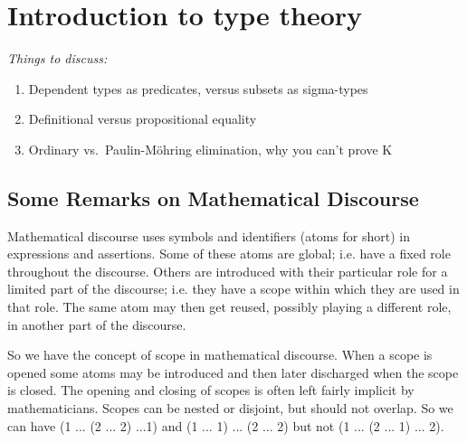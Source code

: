 \chapter{Introduction to type theory}
\label{cha:introduction}

{\it
Things to discuss:
\begin{enumerate}
\item Dependent types as predicates, versus subsets as sigma-types
\item Definitional versus propositional equality
\item Ordinary vs.\ Paulin-M\"ohring elimination, why you can't prove K
\end{enumerate}
}

\newpage
{%


\newcommand{\stype}{{\;\sf type}}
\newcommand{\nat}{{\bf N}}
\newcommand{\rec}{{\sf rec}}
\newcommand{\bool}{{\bf B}}
\newcommand{\app}{{\sf app}}
\newcommand{\pair}{{\sf pair}}
\newcommand{\suc}{{\sf succ}}
\newcommand{\inleft}{{\sf inleft}}
\newcommand{\inright}{{\sf inright}}
\newcommand{\emptyt}{{\bf 0}}
\newcommand{\unitt}{{\bf 1}}
\section*{Some Remarks on Mathematical Discourse}

Mathematical discourse uses symbols and identifiers (atoms for short) in expressions and assertions.  Some of these atoms are global; i.e. have a fixed role throughout the discourse.  Others are introduced with their particular role for a limited part of the discourse; i.e. they have a scope within which they are used in that role.  The same atom may then get reused, possibly playing a different role, in another part of the discourse.  

So we have the concept of scope in mathematical discourse.  When a scope is opened some atoms may be introduced and then later discharged when the scope is closed.  The opening and closing of scopes is often left fairly implicit by mathematicians.  Scopes can be nested or disjoint, but should not overlap.  So we can have (1 ... (2 ... 2) ...1) and (1 ... 1) ... (2 ... 2) but not 
(1 ... (2 ... 1) ... 2).  

}
